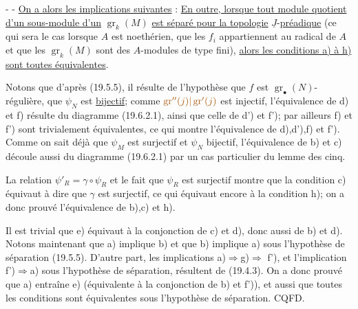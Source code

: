 -  -
\uline{On a alors les implications suivantes} :
\uline{En outre, lorsque tout module quotient d'un sous-module d'un}
$\operatorname{gr}_k(M)$
\uline{est séparé pour la topologie} $\underline J$-\uline{préadique}
(ce qui sera le cas lorsque
$A$ est noethérien, que les $f_i$ appartiennent au radical de $A$ et que
les $\operatorname{gr}_k(M)$ sont des $A$-modules de type fini),
\uline{alors les conditions
a) à h) sont toutes équivalentes}.

Notons que d'après (19.5.5), il résulte de l'hypothèse que $f$ est
$\operatorname{gr}_\bullet(N)$-régulière, que $\psi_N$ est \uline{bijectif};
comme $\unsure{\operatorname{gr}''(j)|\operatorname{gr}'(j)}$ est injectif,
l'équivalence de d) et f) résulte du diagramme (19.6.2.1), ainsi
que celle de d') et f'); par ailleurs f) et f') sont trivialement
équivalentes, ce qui montre l'équivalence de d),d'),f) et f').
Comme on sait déjà que $\psi_M$ est surjectif et $\psi_N$ bijectif, l'équivalence
de b) et c) découle aussi du diagramme (19.6.2.1) par un cas
particulier du lemme des cinq.

La relation $\psi'_R=\gamma\circ\psi_R$
et le fait que $\psi_R$ est surjectif montre que la
condition c) équivaut à dire que $\gamma$ est surjectif, ce qui équivaut
encore à la condition h); on a donc prouvé l'équivalence de b),c)
et h).

Il est trivial que e) équivaut à la  conjonction de c)
et d), donc aussi de b) et d). Notons maintenant que a) implique
b)  et que b) implique a) sous l'hypothèse de séparation
(19.5.5). D'autre part, les implications a)$\Rightarrow$g)$\Rightarrow$ f'),
et
l'implication f')$\Rightarrow$a) sous l'hypothèse de séparation, résultent de
(19.4.3). On a donc prouvé que a) entraîne e) (équivalente à la conjonction
de b) et f')), et aussi que toutes les conditions sont équivalentes
sous l'hypothèse de séparation. CQFD.

